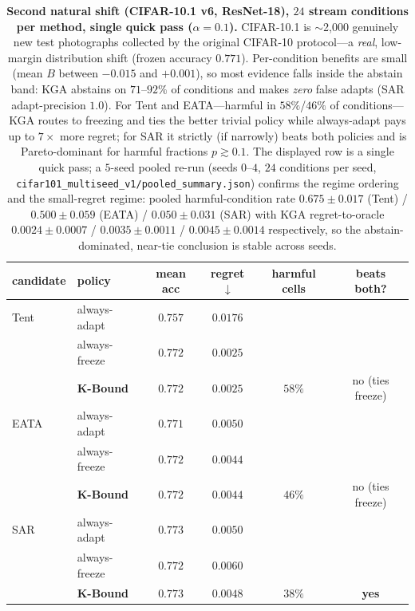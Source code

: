 \documentclass[conference]{IEEEtran}
\theoremstyle{plain}
\theoremstyle{definition}
\begin{document}
\begin{table}[t]\centering\small
\begin{tabular}{llcccc}
\toprule
candidate & policy & mean acc & regret$\downarrow$ & harmful cells & beats both? \\
\midrule
Tent & always-adapt     & $0.757$          & $0.0176$          &        & \\
     & always-freeze    & $\mathbf{0.772}$ & $\mathbf{0.0025}$ &        & \\
     & \textbf{K-Bound} & $\mathbf{0.772}$ & $\mathbf{0.0025}$ & $58\%$ & no (ties freeze) \\
\midrule
EATA & always-adapt     & $0.771$          & $0.0050$          &        & \\
     & always-freeze    & $\mathbf{0.772}$ & $\mathbf{0.0044}$ &        & \\
     & \textbf{K-Bound} & $\mathbf{0.772}$ & $\mathbf{0.0044}$ & $46\%$ & no (ties freeze) \\
\midrule
SAR  & always-adapt     & $0.773$          & $0.0050$          &        & \\
     & always-freeze    & $0.772$          & $0.0060$          &        & \\
     & \textbf{K-Bound} & $\mathbf{0.773}$ & $\mathbf{0.0048}$ & $38\%$ & \textbf{yes} \\
\bottomrule
\end{tabular}
\caption{\textbf{Second natural shift (CIFAR-10.1 v6, ResNet-18), $24$ stream conditions per
method, single quick pass ($\alpha{=}0.1$).} CIFAR-10.1 is $\sim$2{,}000 genuinely new test
photographs collected by the original CIFAR-10 protocol---a \emph{real}, low-margin
distribution shift (frozen accuracy $0.771$). Per-condition benefits are small (mean $B$
between $-0.015$ and $+0.001$), so most evidence falls inside the abstain band:
\textsc{KGA} abstains on $71$--$92\%$ of conditions and makes \emph{zero} false adapts
(SAR adapt-precision $1.0$). For Tent and EATA---harmful in $58\%$/$46\%$ of
conditions---\textsc{KGA} routes to freezing and ties the better trivial policy while
always-adapt pays up to $7\times$ more regret; for SAR it strictly (if narrowly) beats both
policies and is Pareto-dominant for harmful fractions $p\gtrsim0.1$. The displayed row is a
single quick pass; a $5$-seed pooled re-run (seeds $0$--$4$, $24$ conditions per seed,
\texttt{cifar101\_multiseed\_v1/pooled\_summary.json}) confirms the regime ordering and the
small-regret regime: pooled harmful-condition rate $0.675{\pm}0.017$ (Tent) / $0.500{\pm}0.059$
(EATA) / $0.050{\pm}0.031$ (SAR) with \textsc{KGA} regret-to-oracle $0.0024{\pm}0.0007$ /
$0.0035{\pm}0.0011$ / $0.0045{\pm}0.0014$ respectively, so the abstain-dominated, near-tie
conclusion is stable across seeds.}
\label{tab:cifar101}
\end{table}
\end{document}

